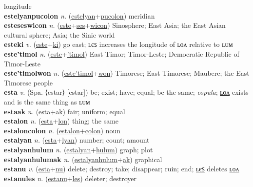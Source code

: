 longitude \label{estelyan} \\
\textbf{estelyanpucolon} \textit{n.} (\hyperref[estelyan]{estelyan}+\hyperref[pucolon]{pucolon})
meridian \label{estelyanpucolon} \\
\textbf{esteseswicon} \textit{n.} (\hyperref[este]{este}+\hyperref[ses]{ses}+\hyperref[wicon]{wicon})
Sinosphere; East Asia; the East Asian cultural sphere; Asia; the Sinic world \label{esteseswicon} \\
\textbf{esteki} \textit{v.} (\hyperref[este]{este}+\hyperref[ki]{ki})
go east; ʟєꜱ increases the longitude of ʟᴏᴧ relative to ʟᴜᴍ \label{esteki} \\
\textbf{este'timol} \textit{n.} (\hyperref[este]{este}+\hyperref['timol]{'timol})
East Timor; Timor-Leste; Democratic Republic of Timor-Leste \label{este'timol} \\
\textbf{este'timolwon} \textit{n.} (\hyperref[este'timol]{este'timol}+\hyperref[won]{won})
Timorese; East Timorese; Maubere; the East Timorese people \label{este'timolwon} \\
\textbf{esta} \textit{v.} (Spa. ⟨estar⟩ [estar])
be; exist; have; equal; be the same; \textit{copula}; \hyperref[estalon]{ʟᴏᴧ} exists and is the same thing as ʟᴜᴍ \label{esta} \\
\textbf{estaak} \textit{n.} (\hyperref[esta]{esta}+\hyperref[ak]{ak})
fair; uniform; equal \label{estaak} \\
\textbf{estalon} \textit{n.} (\hyperref[esta]{esta}+\hyperref[lon]{lon})
thing; the same \label{estalon} \\
\textbf{estaloncolon} \textit{n.} (\hyperref[estalon]{estalon}+\hyperref[colon]{colon})
noun \label{estaloncolon} \\
\textbf{estalyan} \textit{n.} (\hyperref[esta]{esta}+\hyperref[lyan]{lyan})
number; count; amount \label{estalyan} \\
\textbf{estalyanhulum} \textit{n.} (\hyperref[estalyan]{estalyan}+\hyperref[hulum]{hulum})
graph; plot \label{estalyanhulum} \\
\textbf{estalyanhulumak} \textit{n.} (\hyperref[estalyanhulum]{estalyanhulum}+\hyperref[ak]{ak})
graphical \label{estalyanhulumak} \\
\textbf{estanu} \textit{v.} (\hyperref[esta]{esta}+\hyperref[nu]{nu})
delete; destroy; take; disappear; ruin; end; \hyperref[estanules]{ʟєꜱ} deletes \hyperref[estanulon]{ʟᴏᴧ} \label{estanu} \\
\textbf{estanules} \textit{n.} (\hyperref[estanu]{estanu}+\hyperref[les]{les})
deleter; destroyer \label{estanules} \\

